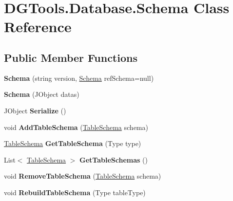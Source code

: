 \hypertarget{class_d_g_tools_1_1_database_1_1_schema}{}\section{D\+G\+Tools.\+Database.\+Schema Class Reference}
\label{class_d_g_tools_1_1_database_1_1_schema}
\subsection*{Public Member Functions}
\begin{DoxyCompactItemize}
\item 
\mbox{\label{class_d_g_tools_1_1_database_1_1_schema_a02426e7cdbe430e352c55e758f41adb3}} 
{\bfseries Schema} (string version, \mbox{\hyperlink{class_d_g_tools_1_1_database_1_1_schema}{Schema}} ref\+Schema=null)
\item 
\mbox{\label{class_d_g_tools_1_1_database_1_1_schema_a85ec8a3578115b4d7b0df22de4e4ad61}} 
{\bfseries Schema} (J\+Object datas)
\item 
\mbox{\label{class_d_g_tools_1_1_database_1_1_schema_a39d45962a78222729b14adeffd6f7859}} 
J\+Object {\bfseries Serialize} ()
\item 
\mbox{\label{class_d_g_tools_1_1_database_1_1_schema_ac32f02b00a0706536bfa17ed2b107fda}} 
void {\bfseries Add\+Table\+Schema} (\mbox{\hyperlink{class_d_g_tools_1_1_database_1_1_table_schema}{Table\+Schema}} schema)
\item 
\mbox{\label{class_d_g_tools_1_1_database_1_1_schema_a4f5b7fd533b18b869c7b6f330baf29a8}} 
\mbox{\hyperlink{class_d_g_tools_1_1_database_1_1_table_schema}{Table\+Schema}} {\bfseries Get\+Table\+Schema} (Type type)
\item 
\mbox{\label{class_d_g_tools_1_1_database_1_1_schema_a5f0f7b3b56a5bf8111e6ed5831def813}} 
List$<$ \mbox{\hyperlink{class_d_g_tools_1_1_database_1_1_table_schema}{Table\+Schema}} $>$ {\bfseries Get\+Table\+Schemas} ()
\item 
\mbox{\label{class_d_g_tools_1_1_database_1_1_schema_a4e8c83af87b68cb05f7df9071dcb856e}} 
void {\bfseries Remove\+Table\+Schema} (\mbox{\hyperlink{class_d_g_tools_1_1_database_1_1_table_schema}{Table\+Schema}} schema)
\item 
\mbox{\label{class_d_g_tools_1_1_database_1_1_schema_a61b8b36fefa3c46df8c1ca038d02b94c}} 
void {\bfseries Rebuild\+Table\+Schema} (Type table\+Type)
\end{DoxyCompactItemize}

